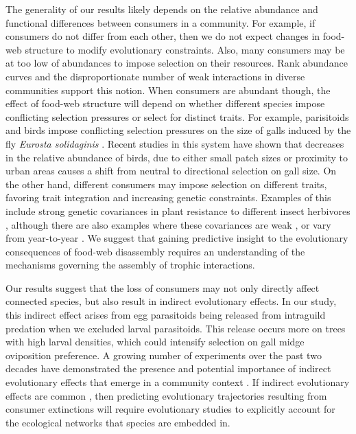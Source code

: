 \documentclass[11pt,]{article}
\begin{document}
The generality of our results likely depends on the relative abundance
and functional differences between consumers in a community. For
example, if consumers do not differ from each other, then we do not
expect changes in food-web structure to modify evolutionary constraints.
Also, many consumers may be at too low of abundances to impose selection
on their resources. Rank abundance curves \citep{Preston1948} and the
disproportionate number of weak interactions in diverse communities
\citep{Paine1992} support this notion. When consumers are abundant
though, the effect of food-web structure will depend on whether
different species impose conflicting selection pressures or select for
distinct traits. For example, parisitoids and birds impose conflicting
selection pressures on the size of galls induced by the fly
\emph{Eurosta solidaginis} \citep{Weis1985, Abrahamson1997}. Recent
studies in this system have shown that decreases in the relative
abundance of birds, due to either small patch sizes \citep{Start2016} or
proximity to urban areas \citep{Start2018} causes a shift from neutral
to directional selection on gall size. On the other hand, different
consumers may impose selection on different traits, favoring trait
integration and increasing genetic constraints. Examples of this include
strong genetic covariances in plant resistance to different insect
herbivores \citep{Maddox1990, Wise2007, Wise2013}, although there are
also examples where these covariances are weak
\citep{Roche1997, Barbour2015}, or vary from year-to-year
\citep{Johnson2007}. We suggest that gaining predictive insight to the
evolutionary consequences of food-web disassembly requires an
understanding of the mechanisms governing the assembly of trophic
interactions.

Our results suggest that the loss of consumers may not only directly
affect connected species, but also result in indirect evolutionary
effects. In our study, this indirect effect arises from egg parasitoids
being released from intraguild predation when we excluded larval
parasitoids. This release occurs more on trees with high larval
densities, which could intensify selection on gall midge oviposition
preference. A growing number of experiments over the past two decades
have demonstrated the presence and potential importance of indirect
evolutionary effects that emerge in a community context
\citep{Pilson1996, Juenger1998, Stinchcombe2001, Lankau2007, Walsh2008, Walsh2010, terHorst2010, Sahli2011, Lau2012, terHorst2015, Schiestl2018, Start2019}.
If indirect evolutionary effects are common
\citep{Miller1996, Walsh2013}, then predicting evolutionary trajectories
resulting from consumer extinctions will require evolutionary studies to
explicitly account for the ecological networks that species are embedded
in.
\end{document}
